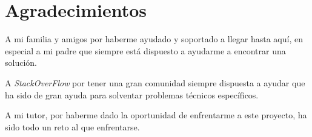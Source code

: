 \section{Agradecimientos}
A mi familia y amigos por haberme ayudado y soportado
a llegar hasta aquí, en especial a mi padre que siempre
está dispuesto a ayudarme a encontrar una solución.

\medskip
A \textit{StackOverFlow} por tener una gran comunidad
siempre dispuesta a ayudar que ha sido de gran ayuda
para solventar problemas técnicos específicos.

\medskip
A mi tutor, \tutor por haberme dado la oportunidad de
enfrentarme a este proyecto, ha sido todo un reto al
que enfrentarse.
